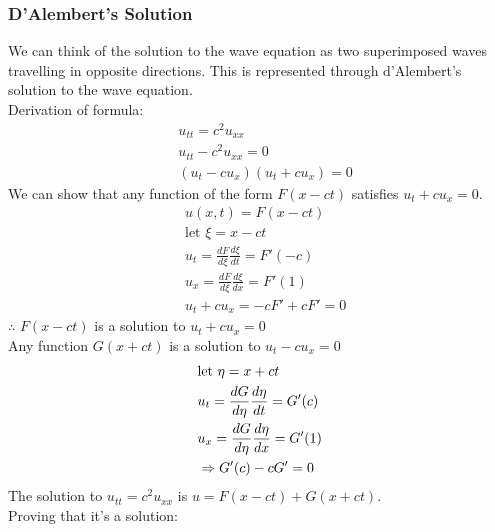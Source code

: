 \documentclass[11pt, fleqn]{article}
\begin{document}
\subsubsection{D'Alembert's Solution}
We can think of the solution to the wave equation as two superimposed waves travelling in opposite directions. This is represented through d'Alembert's solution to the wave equation.\\
Derivation of formula:
\begin{align*}
    &u_{tt}=c^2u_{xx}\\
    &u_{tt}-c^2u_{xx}=0\\
    &(u_t-cu_x)(u_t+cu_x)=0
\end{align*}
We can show that any function of the form $F(x-ct)$ satisfies $u_t+cu_x=0$.
\begin{align*}
    &u(x,t)=F(x-ct)\\
    &\text{let }\xi=x-ct\\
    &u_t=\frac{dF}{d\xi}\frac{d\xi}{dt}=F'(-c)\\
    &u_x=\frac{dF}{d\xi}\frac{d\xi}{dx}=F'(1)\\
    &u_t+cu_x=-cF'+cF'=0
\end{align*}
$\therefore$ $F(x-ct)$ is a solution to $u_t+cu_x=0$\\
Any function $G(x+ct)$ is a solution to $u_t-cu_x=0$
\begin{align*}
    &\text{let }\eta=x+ct\\
    &u_t=\frac{dG}{d\eta}\frac{d\eta}{dt}=G'(c)\\
    &u_x=\frac{dG}{d\eta}\frac{d\eta}{dx}=G'(1)\\
    &\Rightarrow G'(c)-cG'=0
\end{align*}
The solution to $u_{tt}=c^2u_{xx}$ is $u=F(x-ct)+G(x+ct)$.\\
Proving that it's a solution:
\end{document}
